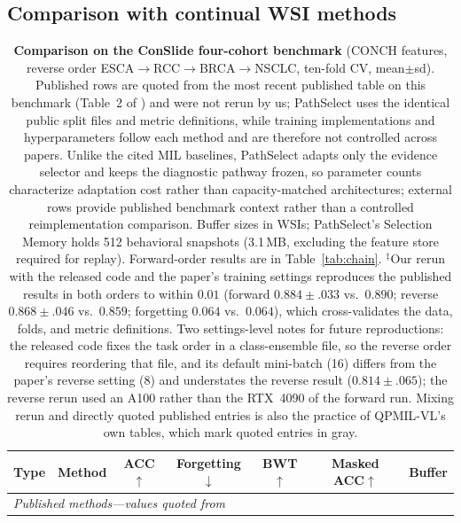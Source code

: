 \documentclass{article}
\begin{document}
\subsection{Comparison with continual WSI methods}
\label{ssec:sota}

\begin{table}[t]
\centering\footnotesize
\caption{\textbf{Comparison on the ConSlide four-cohort benchmark} \cite{huang2023conslide} (CONCH features, reverse order ESCA$\rightarrow$RCC$\rightarrow$BRCA$\rightarrow$NSCLC, ten-fold CV, mean$\pm$sd). Published rows are quoted from the most recent published table on this benchmark (Table~2 of \cite{gou2025qpmil}) and were not rerun by us; PathSelect uses the identical public split files and metric definitions, while training implementations and hyperparameters follow each method and are therefore not controlled across papers. Unlike the cited MIL baselines, PathSelect adapts only the evidence selector and keeps the diagnostic pathway frozen, so parameter counts characterize adaptation cost rather than capacity-matched architectures; external rows provide published benchmark context rather than a controlled reimplementation comparison. Buffer sizes in WSIs; PathSelect's Selection Memory holds 512 behavioral snapshots (3.1\,MB, excluding the feature store required for replay). Forward-order results are in Table~\ref{tab:chain}. $^\ddagger$Our rerun with the released code and the paper's training settings reproduces the published results in both orders to within $0.01$ (forward $0.884{\pm}.033$ vs.\ $0.890$; reverse $0.868{\pm}.046$ vs.\ $0.859$; forgetting $0.064$ vs.\ $0.064$), which cross-validates the data, folds, and metric definitions. Two settings-level notes for future reproductions: the released code fixes the task order in a class-ensemble file, so the reverse order requires reordering that file, and its default mini-batch (16) differs from the paper's reverse setting (8) and understates the reverse result ($0.814{\pm}.065$); the reverse rerun used an A100 rather than the RTX~4090 of the forward run. Mixing rerun and directly quoted published entries is also the practice of QPMIL-VL's own tables, which mark quoted entries in gray.}
\label{tab:sota}
\begin{tabular}{llccccc}
\toprule
Type & Method & ACC$\uparrow$ & Forgetting$\downarrow$ & BWT$\uparrow$ & Masked ACC$\uparrow$ & Buffer \\
\midrule
\multicolumn{7}{l}{\emph{Published methods---values quoted from \cite{gou2025qpmil}}} \\

\end{tabular}
\end{table}
\end{document}
